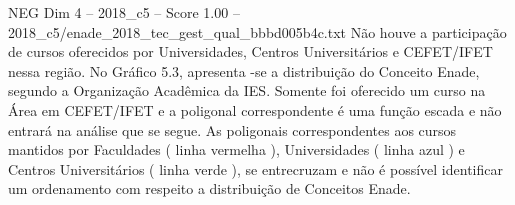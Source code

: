 \begin{textsample}{NEG Dim 4 – 2018\_c5 – Score 1.00 – 2018\_c5/enade\_2018\_tec\_gest\_qual\_bbbd005b4c.txt}
Não houve a participação de cursos oferecidos por Universidades, Centros Universitários e CEFET/IFET nessa região.
No Gráfico 5.3, apresenta -se a distribuição do Conceito Enade, segundo a Organização Acadêmica da IES.
Somente foi oferecido um curso na Área em CEFET/IFET e a poligonal correspondente é uma função escada e não entrará na análise que se segue.
As poligonais correspondentes aos cursos mantidos por Faculdades ( linha vermelha ), Universidades ( linha azul ) e Centros Universitários ( linha verde ), se entrecruzam e não é possível identificar um ordenamento com respeito a distribuição de Conceitos Enade.

\end{textsample}
